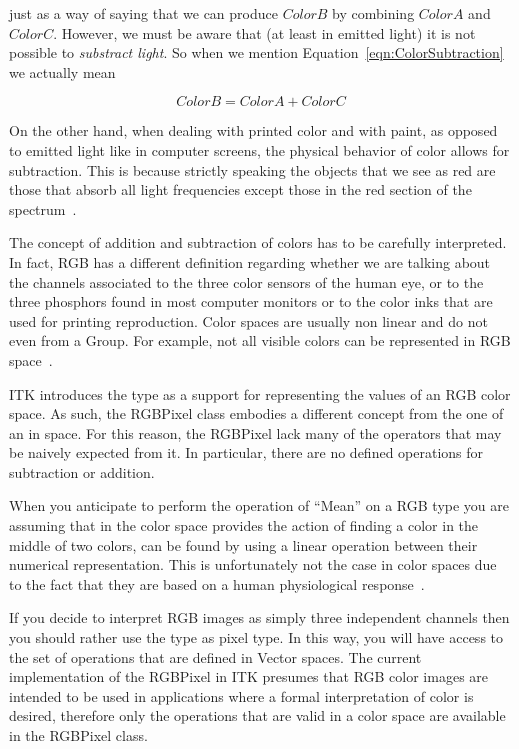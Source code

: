 just as a way of saying that we can produce $ColorB$ by combining $ColorA$ and
$ColorC$.  However, we must be aware that (at least in emitted light) it is not
possible to \emph{substract light}. So when we mention
Equation~\ref{eqn:ColorSubtraction} we actually mean

\begin{equation}
\label{eqn:ColorAddition}
         ColorB = ColorA + ColorC
\end{equation}

On the other hand, when dealing with printed color and with paint, as opposed
to emitted light like in computer screens, the physical behavior of color
allows for subtraction. This is because strictly speaking the objects that we
see as red are those that absorb all light frequencies except those in the red
section of the spectrum~\cite{Wyszecki2000}.

The concept of addition and subtraction of colors has to be carefully
interpreted. In fact, RGB has a different definition regarding whether we are
talking about the channels associated to the three color sensors of the human
eye, or to the three phosphors found in most computer monitors or to the color
inks that are used for printing reproduction.  Color spaces are usually non
linear and do not even from a Group. For example, not all visible colors can be
represented in RGB space~\cite{Wyszecki2000}.

ITK introduces the  type as a support for representing the
values of an RGB color space. As such, the RGBPixel class embodies a different
concept from the one of an  in space. For this reason, the
RGBPixel lack many of the operators that may be naively expected from it. In
particular, there are no defined operations for subtraction or addition.

When you anticipate to perform the operation of ``Mean'' on a RGB type you are
assuming that in the color space provides the action of finding a color in the
middle of two colors, can be found by using a linear operation between their
numerical representation. This is unfortunately not the case in  color spaces
due to the fact that they are based on a human physiological
response~\cite{Malacara2002}.

If you decide to interpret RGB images as simply three independent channels then
you should rather use the  type as pixel type. In this way, you
will have access to the set of operations that are defined in Vector spaces.
The current implementation of the RGBPixel in ITK presumes that RGB color
images are intended to be used in applications where a formal interpretation of
color is desired, therefore only the operations that are valid in a color space
are available in the RGBPixel class.

